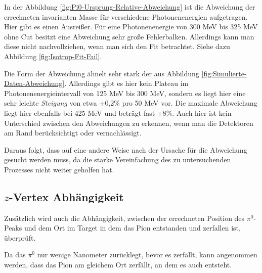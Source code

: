 \documentclass[a4paper,11pt,oneside,final,german,openbib,pdftex]{scrbook}
\begin{document}
{In der Abbildung \ref{fig:Pi0-Ursprung-Relative-Abweichung} ist die Abweichung der errechneten invarianten Masse für verschiedene Photonenenergien aufgetragen.
Hier gibt es einen Ausrei{\ss}er. F\"ur eine Photonenenergie von 300 MeV bis 325 MeV ohne Cut besitzt eine Abweichung sehr gro{\ss}e Fehlerbalken. Allerdings kann man diese nicht nachvollziehen, wenn man sich den Fit betrachtet. Siehe dazu Abbildung \ref{fig:Isotrop-Fit-Fail}.

 Die Form der Abweichung ähnelt sehr stark der aus Abbildung \ref{fig:Simulierte-Daten-Abweichung}.
 Allerdings gibt es hier kein Plateau im Photonenenergieintervall von 125 MeV bis 300 MeV, sondern es liegt hier eine sehr leichte \textit{Steigung} von etwa +0,2\% pro 50 MeV vor. Die maximale Abweichung liegt hier ebenfalls bei 425 MeV und betr\"agt fast +8\%. Auch hier ist kein Unterschied zwischen den Abweichungen zu erkennen, wenn man die Detektoren am Rand berücksichtigt oder vernachlässigt. 

Daraus folgt, dass auf eine andere Weise nach der Ursache für die Abweichung gesucht werden muss, da die starke Vereinfachung des zu untersuchenden Prozesses nicht weiter geholfen hat.


\subsection{$z$-Vertex Abh\"angigkeit}
\label{sec:Z-Vertex-Abhaengigkeit}


Zusätzlich wird auch die Abh\"angigkeit, zwischen der errechneten  Position des $\pi^0$-Peaks und dem Ort im Target in dem das Pion entstanden und zerfallen ist, \"uberpr\"uft. 

Da das $\pi^0$ nur wenige Nanometer zur\"ucklegt, bevor es zerf\"allt, kann angenommen werden, dass das Pion am gleichem Ort zerf\"allt, an dem es auch entsteht.


}
\end{document}
